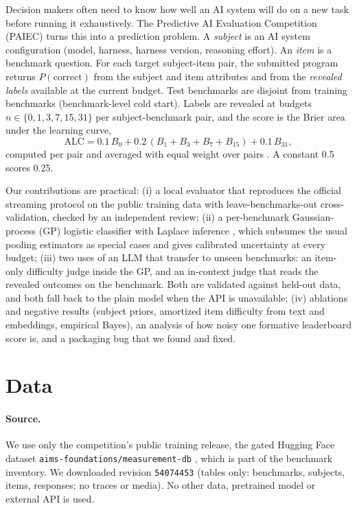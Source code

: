 \documentclass{article}
\begin{document}
Decision makers often need to know how well an AI system will do on a new task before running it
exhaustively. The Predictive AI Evaluation Competition (PAIEC) \citep{paiec_site} turns this into a
prediction problem. A \emph{subject} is an AI system configuration (model, harness, harness version,
reasoning effort). An \emph{item} is a benchmark question. For each target subject-item pair, the
submitted program returns $P(\text{correct})$ from the subject and item attributes and from the
\emph{revealed labels} available at the current budget. Test benchmarks are disjoint from training
benchmarks (benchmark-level cold start). Labels are revealed at budgets $n \in \{0,1,3,7,15,31\}$ per
subject-benchmark pair, and the score is the Brier area under the learning curve,
\begin{equation}
\mathrm{ALC} = 0.1\,B_0 + 0.2\,(B_1 + B_3 + B_7 + B_{15}) + 0.1\,B_{31},
\end{equation}
computed per pair and averaged with equal weight over pairs \citep{brier1950}. A constant 0.5 scores 0.25.

Our contributions are practical:
(i) a local evaluator that reproduces the official streaming protocol on the public training data
with leave-benchmarks-out cross-validation, checked by an independent review;
(ii) a per-benchmark Gaussian-process (GP) logistic classifier with Laplace inference
\citep{williams1998,rasmussen2006}, which subsumes the usual pooling estimators as special cases and
gives calibrated uncertainty at every budget;
(iii) two uses of an LLM that transfer to unseen benchmarks: an item-only difficulty judge inside the
GP, and an in-context judge that reads the revealed outcomes on the benchmark. Both are validated
against held-out data, and both fall back to the plain model when the API is unavailable;
(iv) ablations and negative results (subject priors, amortized item difficulty from text and
embeddings, empirical Bayes), an analysis of how noisy one formative leaderboard score is, and a
packaging bug that we found and fixed.

\section{Data}

\paragraph{Source.} We use only the competition's public training release, the gated Hugging Face
dataset \texttt{aims-foundations/measurement-db} \citep{measurementdb}, which is part of the
benchmark inventory. We downloaded revision \texttt{54074453} (tables only: benchmarks, subjects,
items, responses; no traces or media). No other data, pretrained model or external API is used.
\end{document}
